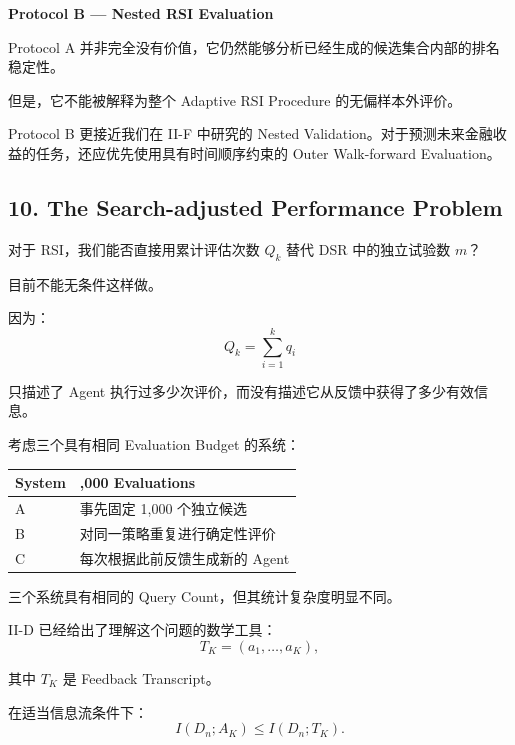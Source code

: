 \textbf{Protocol B --- Nested RSI Evaluation}


Protocol A 并非完全没有价值，它仍然能够分析已经生成的候选集合内部的排名稳定性。

但是，它不能被解释为整个 Adaptive RSI Procedure 的无偏样本外评价。

Protocol B 更接近我们在 II-F 中研究的 Nested Validation。对于预测未来金融收益的任务，还应优先使用具有时间顺序约束的 Outer Walk-forward Evaluation。

\hypertarget{part-4-71-0001-the-search-adjusted-performance-problem}{%
\subsection{10. The Search-adjusted Performance Problem}\label{part-4-71-0001-the-search-adjusted-performance-problem}}

对于 RSI，我们能否直接用累计评估次数 \(Q_k\) 替代 DSR 中的独立试验数 \(m\)？

目前不能无条件这样做。

因为：
\[Q_k=\sum_{i=1}^{k}q_i\]

只描述了 Agent 执行过多少次评价，而没有描述它从反馈中获得了多少有效信息。

考虑三个具有相同 Evaluation Budget 的系统：

\begin{readertable}
\begin{longtable}[]{@{}
  >{\raggedright\arraybackslash}p{}
  >{\raggedright\arraybackslash}p{}@{}}
\toprule
System & 1,000 Evaluations \\
\midrule
\endhead
A & 事先固定 1,000 个独立候选 \\
B & 对同一策略重复进行确定性评价 \\
C & 每次根据此前反馈生成新的 Agent \\
\bottomrule
\end{longtable}
\end{readertable}

三个系统具有相同的 Query Count，但其统计复杂度明显不同。

II-D 已经给出了理解这个问题的数学工具：
\[T_K=(a_1,\ldots,a_K),\]

其中 \(T_K\) 是 Feedback Transcript。

在适当信息流条件下：
\[I(D_n;A_K)
\leq I(D_n;T_K).\]

